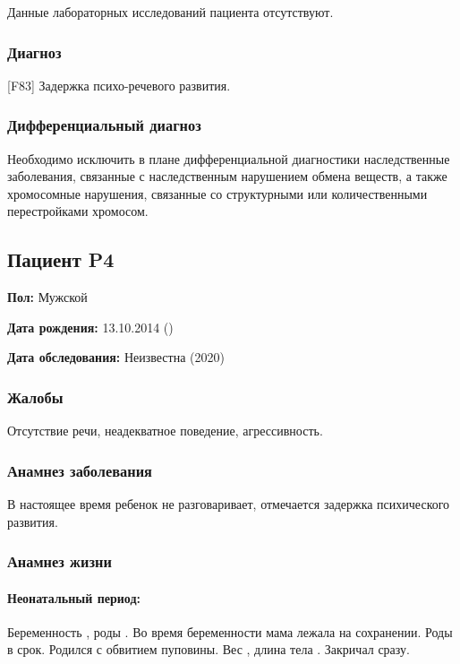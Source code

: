 \documentclass[a4paper,14pt]{extarticle}
\newcommand{\gramm}{г}
\newcommand{\cm}{см}
\newcommand{\DS}[2]{[#2] #1}
\begin{document}
Данные лабораторных исследований пациента отсутствуют.

\subsubsection*{Диагноз}

\DS{Задержка психо-речевого развития}{F83}.

\subsubsection*{Дифференциальный диагноз}

Необходимо исключить в плане дифференциальной диагностики наследственные заболевания, связанные  с наследственным нарушением обмена веществ, а также хромосомные нарушения, связанные со структурными или количественными перестройками хромосом.

\newpage
\subsection*{Пациент P4}

\textbf{Пол:} Мужской

\textbf{Дата рождения:} 13.10.2014 ()

\textbf{Дата обследования:} Неизвестна (2020) 

\subsubsection*{Жалобы}

Отсутствие речи, неадекватное поведение, агрессивность.

\subsubsection*{Анамнез заболевания}

В настоящее время ребенок не разговаривает, отмечается задержка психического развития.

\subsubsection*{Анамнез жизни}

\paragraph{Неонатальный период:} Беременность , роды . Во время беременности мама лежала на сохранении. Роды в срок. Родился с обвитием пуповины.
Вес \numprint[\gramm]{4470}, длина тела \numprint[\cm]{57}.
Закричал сразу. 
\end{document}

